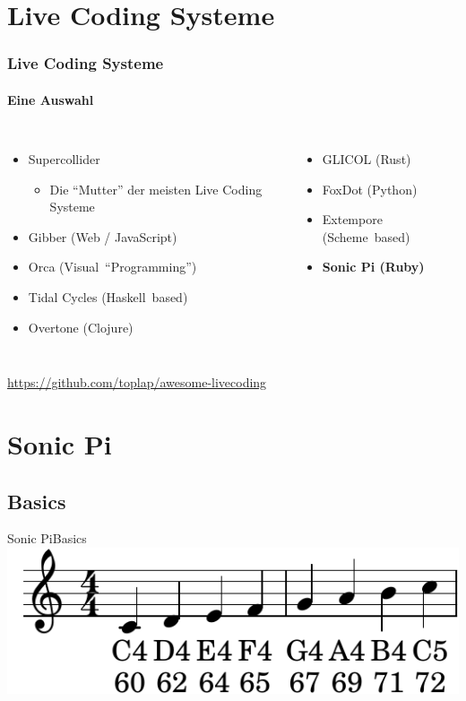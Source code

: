 \documentclass{beamer}
\begin{document}
\section{Live Coding Systeme}
\begin{frame}
  \frametitle{Live Coding Systeme}
  \framesubtitle{Eine Auswahl}
  \begin{columns}
    \begin{itemize}
      \item Supercollider
        \begin{itemize}
          \item Die ``Mutter'' der meisten Live Coding Systeme
        \end{itemize}
      \pause\item Gibber (Web / JavaScript)
      \pause\item Orca (Visual~``Programming'')
      \pause\item Tidal Cycles (Haskell~based)
      \pause\item Overtone (Clojure)
    \end{itemize}

    \begin{itemize}
      \pause\item GLICOL (Rust)
      \pause\item FoxDot (Python)
      \pause\item Extempore (Scheme~based)
      \pause\item \textbf{Sonic Pi (Ruby)}
    \end{itemize}
  \end{columns}
  \pause\centering
  \vspace{1em}
  \url{https://github.com/toplap/awesome-livecoding}
\end{frame}

\section{Sonic Pi}
\subsection{Basics}
\begin{frame}{Sonic Pi}{Basics}
  \includegraphics{images/scale.pdf}
\end{frame}
\end{document}
